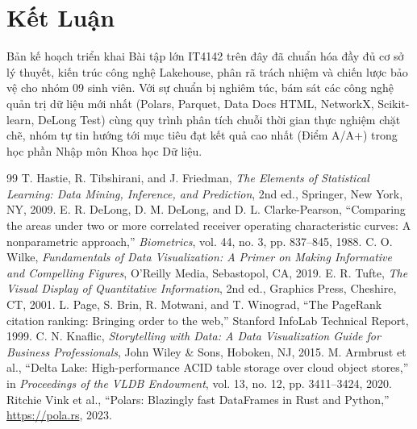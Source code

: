 \documentclass[11pt,a4paper]{article}
\begin{document}
\section{Kết Luận}
Bản kế hoạch triển khai Bài tập lớn IT4142 trên đây đã chuẩn hóa đầy đủ cơ sở lý thuyết, kiến trúc công nghệ Lakehouse, phân rã trách nhiệm và chiến lược bảo vệ cho nhóm 09 sinh viên. Với sự chuẩn bị nghiêm túc, bám sát các công nghệ quản trị dữ liệu mới nhất (Polars, Parquet, Data Docs HTML, NetworkX, Scikit-learn, DeLong Test) cùng quy trình phân tích chuỗi thời gian thực nghiệm chặt chẽ, nhóm tự tin hướng tới mục tiêu đạt kết quả cao nhất (Điểm A/A+) trong học phần Nhập môn Khoa học Dữ liệu.

\begin{thebibliography}{99}
 T. Hastie, R. Tibshirani, and J. Friedman, \textit{The Elements of Statistical Learning: Data Mining, Inference, and Prediction}, 2nd ed., Springer, New York, NY, 2009.
 E. R. DeLong, D. M. DeLong, and D. L. Clarke-Pearson, “Comparing the areas under two or more correlated receiver operating characteristic curves: A nonparametric approach,” \textit{Biometrics}, vol. 44, no. 3, pp. 837--845, 1988.
 C. O. Wilke, \textit{Fundamentals of Data Visualization: A Primer on Making Informative and Compelling Figures}, O'Reilly Media, Sebastopol, CA, 2019.
 E. R. Tufte, \textit{The Visual Display of Quantitative Information}, 2nd ed., Graphics Press, Cheshire, CT, 2001.
 L. Page, S. Brin, R. Motwani, and T. Winograd, “The PageRank citation ranking: Bringing order to the web,” Stanford InfoLab Technical Report, 1999.
 C. N. Knaflic, \textit{Storytelling with Data: A Data Visualization Guide for Business Professionals}, John Wiley \& Sons, Hoboken, NJ, 2015.
 M. Armbrust et al., “Delta Lake: High-performance ACID table storage over cloud object stores,” in \textit{Proceedings of the VLDB Endowment}, vol. 13, no. 12, pp. 3411--3424, 2020.
 Ritchie Vink et al., “Polars: Blazingly fast DataFrames in Rust and Python,” \url{https://pola.rs}, 2023.
\end{thebibliography}
\end{document}
